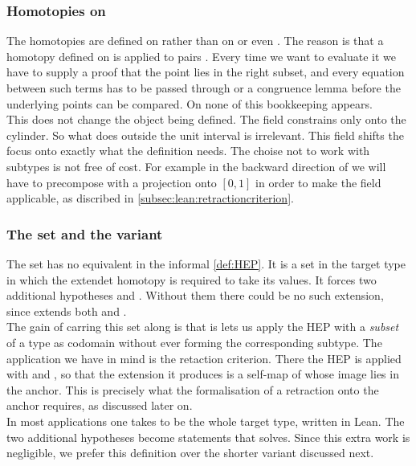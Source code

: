 \documentclass[11pt, a4paper, english]{article}
\theoremstyle{plain}
\theoremstyle{definition}
\theoremstyle{remark}
\numberwithin{equation}{section}
\numberwithin{theorem}{section}
\begin{document}
\subsubsection*{Homotopies on }
The homotopies are defined on  rather than on  or even . The reason is that a homotopy defined on  is applied to pairs . Every time we want to evaluate it we have to supply a proof that the point lies in the right subset, and every equation between such terms has to be passed through  or a congruence lemma before the underlying points can be compared. On  none of this bookkeeping appears. \\
This does not change the object being defined. The field  constrains  only onto the cylinder. So what  does outside the unit interval is irrelevant. This field shifts the focus onto exactly what the definition needs. The choise not to work with subtypes is not free of cost. For example in the backward direction of  we will have to precompose with a projection onto $[0,1]$ in order to make the  field applicable, as discribed in \cref{subsec:lean:retractioncriterion}.\\

\subsubsection*{The set  and the variant }

The set  has no equivalent in the informal \cref{def:HEP}. It is a set in the target type  in which the extendet homotopy  is required to take its values. It forces two additional hypotheses  and . Without them there could be no such extension, since  extends both  and .\\

The gain of carring this set along is that is lets us apply the HEP with a \emph{subset} of a type as codomain without ever forming the corresponding subtype. The application we have in mind is the retaction criterion. There the HEP is applied with  and , so that the extension it produces is a self-map of  whose image lies in the anchor. This is precisely what the formalisation of a retraction onto the anchor requires, as discussed later on. \\
In most applications one takes  to be the whole target type, written   in Lean. The two additional hypotheses become statements that  solves. Since this extra work is negligible, we prefer this definition over the shorter variant discussed next. \\
\end{document}
